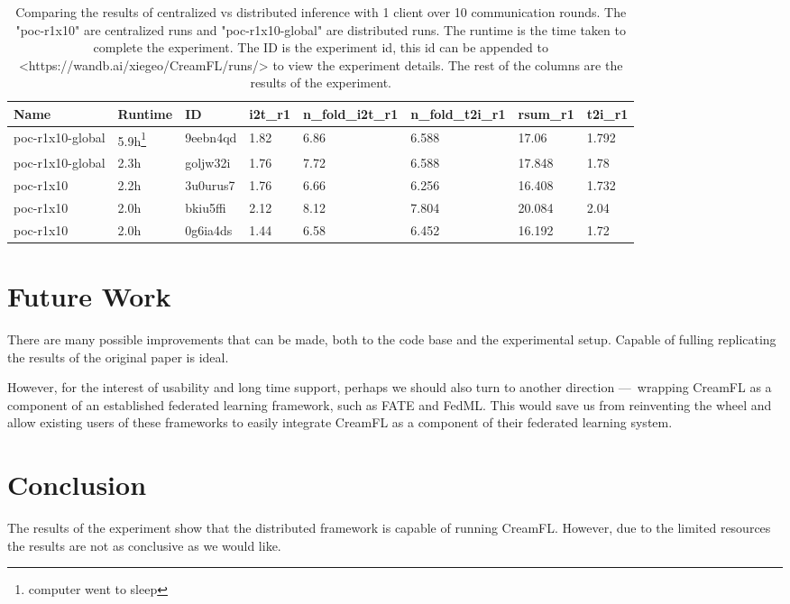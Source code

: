 \documentclass{article}
\begin{document}
\begin{table}
    \centering
    \begin{tabular}{|l|l|l|l|l|l|l|l|}
    \hline
    Name & Runtime & ID & i2t\_r1 & n\_fold\_i2t\_r1 & n\_fold\_t2i\_r1 & rsum\_r1 & t2i\_r1 \\
    \hline
    poc-r1x10-global & 5.9h\footnote{computer went to sleep} & 9eebn4qd & 1.82 & 6.86 & 6.588 & 17.06 & 1.792 \\
    poc-r1x10-global & 2.3h & goljw32i & 1.76 & 7.72 & 6.588 & 17.848 & 1.78 \\
    poc-r1x10 & 2.2h & 3u0urus7 & 1.76 & 6.66 & 6.256 & 16.408 & 1.732 \\
    poc-r1x10 & 2.0h & bkiu5ffi & 2.12 & 8.12 & 7.804 & 20.084 & 2.04 \\
    poc-r1x10 & 2.0h & 0g6ia4ds & 1.44 & 6.58 & 6.452 & 16.192 & 1.72 \\
    \hline
    \end{tabular}
    \caption{Comparing the results of centralized vs distributed inference with 1 client over 10 communication rounds. The "poc-r1x10" are centralized runs and "poc-r1x10-global" are distributed runs. The runtime is the time taken to complete the experiment. The ID is the experiment id, this id can be appended to <https://wandb.ai/xiegeo/CreamFL/runs/> to view the experiment details. The rest of the columns are the results of the experiment.}
    \label{table:r1x10}
\end{table}


\section{Future Work}

There are many possible improvements that can be made, both to the code base and the experimental setup. Capable of fulling replicating the results of the original paper is ideal.

However, for the interest of usability and long time support, perhaps we should also turn to another direction ---\ wrapping CreamFL as a component of an established federated learning framework, such as FATE and FedML. This would save us from reinventing the wheel and allow existing users of these frameworks to easily integrate CreamFL as a component of their federated learning system.

\section{Conclusion}

The results of the experiment show that the distributed framework is capable of running CreamFL. However, due to the limited resources the results are not as conclusive as we would like. 



\end{document}
